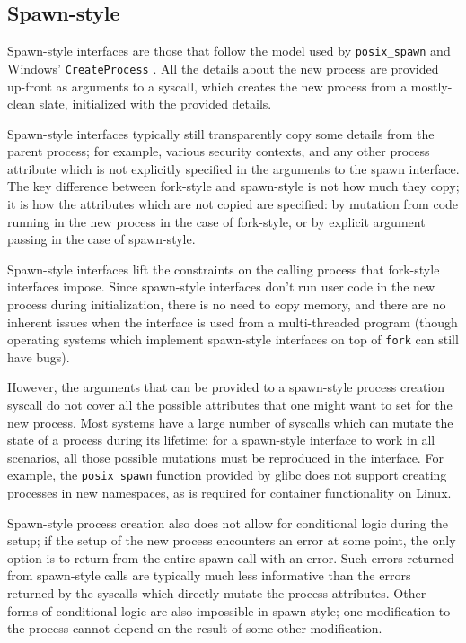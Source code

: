 \documentclass{acmart}
\begin{document}
\subsection{Spawn-style}
Spawn-style interfaces are those that follow the model used by \texttt{posix\_spawn} \cite{posix_spawn}
and Windows' \texttt{CreateProcess} \cite{create_process}.
All the details about the new process are provided up-front as arguments to a syscall,
which creates the new process from a mostly-clean slate, initialized with the provided details.

Spawn-style interfaces typically still transparently copy some details from the parent process;
for example, various security contexts,
and any other process attribute which is not explicitly specified in the arguments to the spawn interface.
The key difference between fork-style and spawn-style is not how much they copy;
it is how the attributes which are not copied are specified:
by mutation from code running in the new process in the case of fork-style,
or by explicit argument passing in the case of spawn-style.

Spawn-style interfaces lift the constraints on the calling process that fork-style interfaces impose.
Since spawn-style interfaces don't run user code in the new process during initialization,
there is no need to copy memory,
and there are no inherent issues when the interface is used from a multi-threaded program
(though operating systems which implement spawn-style interfaces on top of \texttt{fork} can still have bugs).

However, the arguments that can be provided to a spawn-style process creation syscall
do not cover all the possible attributes that one might want to set for the new process.
Most systems have a large number of syscalls which can mutate the state of a process during its lifetime;
for a spawn-style interface to work in all scenarios,
all those possible mutations must be reproduced in the interface.
For example, the \texttt{posix\_spawn} function provided by glibc does not support creating processes in new namespaces,
as is required for container functionality on Linux.

Spawn-style process creation also does not allow for conditional logic during the setup;
if the setup of the new process encounters an error at some point,
the only option is to return from the entire spawn call with an error.
Such errors returned from spawn-style calls
are typically much less informative
than the errors returned by the syscalls which directly mutate the process attributes.
Other forms of conditional logic are also impossible in spawn-style;
one modification to the process cannot depend on the result of some other modification.
\end{document}
